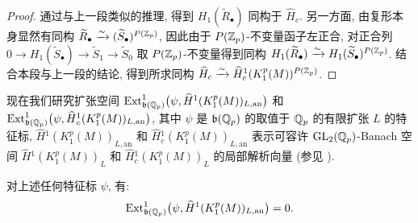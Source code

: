 \begin{proof}
通过与上一段类似的推理, 得到 $H_1(\widetilde{R}_{\bullet})$ 同构于 $\widehat{H}_c$.
另一方面, 由复形本身显然有同构 $\widetilde{R}_{\bullet} \xrightarrow{\sim} (\widetilde{S}_{\bullet})^{P(\mathbb{Z}_p)}$, 因此由于 $P(\mathbb{Z}_p)$-不变量函子左正合, 对正合列 $0 \to H_1(\widetilde{S}_{\bullet}) \to \widetilde{S}_1 \to \widetilde{S}_0$ 取 $P(\mathbb{Z}_p)$-不变量得到同构 $H_1(\widetilde{R}_{\bullet}) \xrightarrow{\sim} H_1(\widetilde{S}_{\bullet})^{P(\mathbb{Z}_p)}$.
结合本段与上一段的结论, 得到所求同构 $\widehat{H}_c \xrightarrow{\sim} \widehat{H}_{c}^{1}(K_1^{p}(M))^{P(\mathbb{Z}_p)}$.
\end{proof}

现在我们研究扩张空间 $\operatorname{Ext}_{\mathfrak{b}(\mathbb{Q}_p)}^{1}\bigl(\psi,\widehat{H}{}^{1}(K_1^{p}(M))_{L,\mathrm{an}}\bigr)$ 和 $\operatorname{Ext}_{\mathfrak{b}(\mathbb{Q}_p)}^{1}\bigl(\psi,\widehat{H}{}_{c}^{1}(K_1^{p}(M))_{L,\mathrm{an}}\bigr)$, 其中 $\psi$ 是 $\mathfrak{b}(\mathbb{Q}_p)$ 的取值于 $\mathbb{Q}_p$ 的有限扩张 $L$ 的特征标, $\widehat{H}{}^{1}(K_1^{p}(M))_{L,\mathrm{an}}$ 和 $\widehat{H}{}_{c}^{1}(K_1^{p}(M))_{L,\mathrm{an}}$ 表示可容许 $\mathrm{GL}_2(\mathbb{Q}_p)$-Banach 空间 $\widehat{H}{}^{1}(K_1^{p}(M))_L$ 和 $\widehat{H}{}_{c}^{1}(K_1^{p}(M))_L$ 的局部解析向量 (参见 \cite[\S7]{ref:45}).

\begin{proposition}\label{prop:5.1.2}
对上述任何特征标 $\psi$, 有:
\[
\operatorname{Ext}_{\mathfrak{b}(\mathbb{Q}_p)}^{1}\bigl(\psi,\widehat{H}{}^{1}(K_1^{p}(M))_{L,\mathrm{an}}\bigr) = 0.
\]
\end{proposition}

